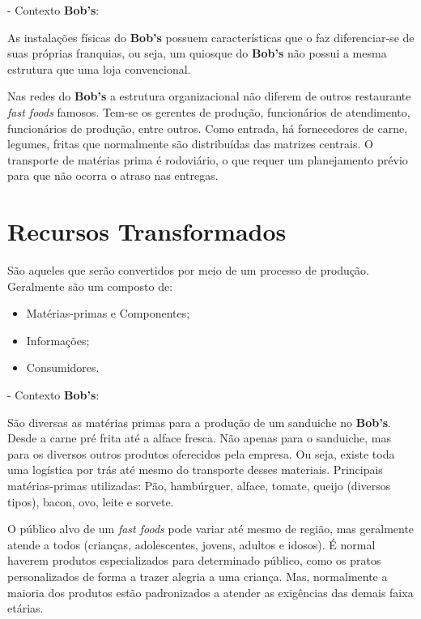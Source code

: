		- Contexto \textbf{Bob’s}:

		As instalações físicas do \textbf{Bob’s} possuem características que o faz diferenciar-se de suas próprias franquias, ou seja, um quiosque do \textbf{Bob’s} não possui a mesma estrutura que uma loja convencional.
		
		Nas redes do \textbf{Bob’s} a estrutura organizacional não diferem de outros restaurante \emph{fast foods} famosos. Tem-se os gerentes de produção, funcionários de atendimento, funcionários de produção, entre outros. Como entrada, há fornecedores de carne, legumes, fritas que normalmente são distribuídas das matrizes centrais. O transporte de matérias prima é rodoviário, o que requer um planejamento prévio para que não ocorra o atraso nas entregas.


	\section[Recursos Transformados]{Recursos Transformados}
	\label{sec:dados_transformados}

		São aqueles que serão convertidos por meio de um processo de produção. Geralmente são um composto de: 

		\begin{itemize}
			\item{Matérias-primas e Componentes;}
			\item{Informações;}
			\item{Consumidores.}
		\end{itemize}
		
		- Contexto \textbf{Bob’s}:

		São diversas as matérias primas para a produção de um sanduiche no \textbf{Bob’s}. Desde a carne pré frita até a alface fresca. Não apenas para o sanduiche, mas para os diversos outros produtos oferecidos pela empresa. Ou seja, existe toda uma logística por trás até mesmo do transporte desses materiais. Principais matérias-primas utilizadas: Pão, hambúrguer, alface, tomate, queijo (diversos tipos), bacon, ovo, leite e sorvete.

		O público alvo de um \emph{fast foods} pode variar até mesmo de região, mas geralmente atende a todos (crianças, adolescentes, jovens, adultos e idosos). É normal haverem produtos especializados para determinado público, como os pratos personalizados de forma a trazer alegria a uma criança. Mas, normalmente a maioria dos produtos estão padronizados a atender as exigências das demais faixa etárias.

